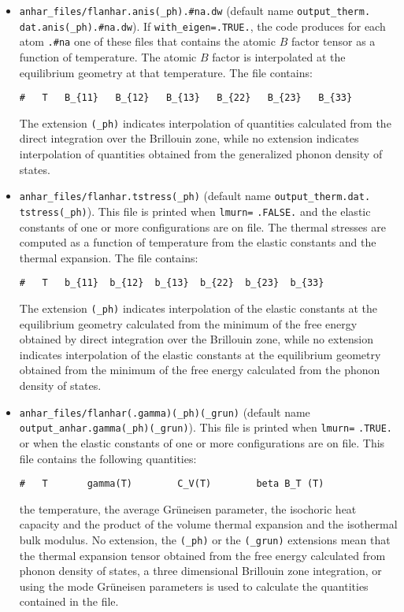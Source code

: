 \documentclass[12pt,a4paper,twoside]{report}
\begin{document}
\begin{itemize}
\item
\texttt{anhar\_files/flanhar.anis(\_ph).\#na.dw} (default name
\texttt{output\_therm.} \texttt{dat.anis(\_ph).\#na.dw}).
If \texttt{with\_eigen=.TRUE.}, the code produces for each atom 
\texttt{.\#na} one of these
files that contains the atomic $B$ factor tensor as a function of
temperature. The atomic $B$ factor is interpolated at the equilibrium
geometry at that temperature. The file contains:
\begin{verbatim}
#   T   B_{11}   B_{12}   B_{13}   B_{22}   B_{23}   B_{33}
\end{verbatim}
The extension \texttt{(\_ph)} indicates interpolation of
quantities calculated from the direct integration over the Brillouin zone,
while no extension indicates interpolation of quantities obtained
from the generalized phonon density of states.


\item
\texttt{anhar\_files/flanhar.tstress(\_ph)} (default name 
\texttt{output\_therm.dat.} \texttt{tstress(\_ph)}).
This file is printed when \texttt{lmurn=} \texttt{.FALSE.} and the 
elastic constants 
of one or more configurations are on file.
The thermal stresses are computed as a function of temperature from the
elastic constants and the thermal expansion.
The file contains:
\begin{verbatim}
#   T   b_{11}  b_{12}  b_{13}  b_{22}  b_{23}  b_{33}
\end{verbatim}
The extension \texttt{(\_ph)} indicates interpolation of
the elastic constants at the equilibrium geometry calculated from the 
minimum of the free energy obtained by direct integration over the 
Brillouin zone,
while no extension indicates interpolation of the elastic constants at
the equilibrium geometry obtained from the minimum of the free energy 
calculated from the phonon density of states.

\item 
\texttt{anhar\_files/flanhar(.gamma)(\_ph)(\_grun)} 
(default name \\ \texttt{output\_anhar.gamma(\_ph)(\_grun)}). 
This file is printed
when \texttt{lmurn=} \texttt{.TRUE.} or when the elastic
constants of one or more configurations are on file.
This file contains the following quantities:
\begin{verbatim}
#   T       gamma(T)        C_V(T)        beta B_T (T)    
\end{verbatim}
the temperature, the average Gr\"uneisen parameter, the isochoric
heat capacity and the product of the volume thermal expansion and the
isothermal bulk modulus.
No extension, the \texttt{(\_ph)} or the \texttt{(\_grun)}
extensions mean that the thermal expansion tensor obtained from the
free energy calculated from phonon density of states,
a three dimensional Brillouin zone integration, or using the
mode Gr\"uneisen parameters is used to calculate the quantities 
contained in the file.


\end{itemize}
\end{document}
